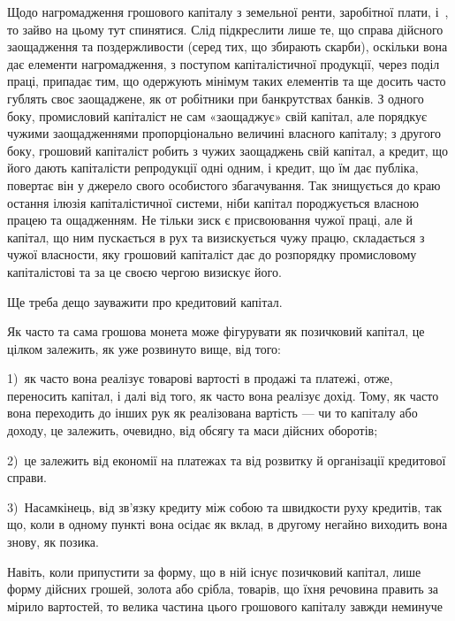 Щодо нагромадження грошового капіталу з земельної ренти, заробітної плати,
і~, то зайво на цьому тут спинятися. Слід підкреслити лише те, що справа
дійсного заощадження та поздержливости (серед тих, що збирають скарби), оскільки
вона дає елементи нагромадження, з поступом капіталістичної продукції, через поділ
праці, припадає тим, що одержують мінімум таких елементів та ще досить часто
гублять своє заощаджене, як от робітники при банкрутствах банків. З одного
боку, промисловий капіталіст не сам «заощаджує» свій капітал, але порядкує чужими
заощадженнями пропорціонально величині власного капіталу; з другого боку,
грошовий капіталіст робить з чужих заощаджень свій капітал, а кредит, що його
дають капіталісти репродукції одні одним, і кредит, що їм дає публіка, повертає
він у джерело свого особистого збагачування. Так знищується до краю остання
ілюзія капіталістичної системи, ніби капітал породжується власною працею та ощадженням.
Не тільки зиск є присвоювання чужої праці, але й капітал, що ним
пускається в рух та визискується чужу працю, складається з чужої власности,
яку грошовий капіталіст дає до розпорядку промисловому капіталістові та за
це своєю чергою визискує його.

Ще треба дещо зауважити про кредитовий капітал.

Як часто та сама грошова монета може фігурувати як позичковий капітал,
це цілком залежить, як уже розвинуто вище, від того:

1)~як часто вона реалізує товарові вартості в продажі та платежі, отже,
переносить капітал, і далі від того, як часто вона реалізує дохід. Тому, як
часто вона переходить до інших рук як реалізована вартість — чи то капіталу
або доходу, це залежить, очевидно, від обсягу та маси дійсних оборотів;

2)~це залежить від економії на платежах та від розвитку й організації
кредитової справи.

3)~Насамкінець, від зв’язку кредиту між собою та швидкости руху кредитів,
так що, коли в одному пункті вона осідає як вклад, в другому негайно
виходить вона знову, як позика.

Навіть, коли припустити за форму, що в ній існує позичковий капітал, лише
форму дійсних грошей, золота або срібла, товарів, що їхня речовина править за
мірило вартостей, то велика частина цього грошового капіталу завжди неминуче
\parbreak{}  %
